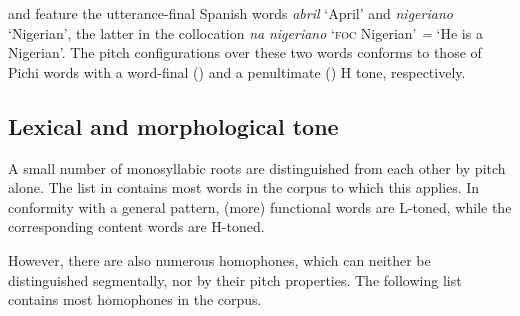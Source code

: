  
 and  feature the utterance-final Spanish words \textit{abril} ‘April’ and \textit{nigeriano} ‘Nigerian’, the latter in the collocation \textit{na} \textit{nigeriano} ‘\textsc{foc} Nigerian’ \textit{=} ‘He is a Nigerian’. The pitch configurations over these two words conforms to those of Pichi words with a word-final () and a penultimate () H tone, respectively. 


   \newpage 
 
\subsection{Lexical and morphological tone}

A small number of monosyllabic roots are distinguished from each other by pitch alone. The list in  contains most words in the corpus to which this applies. In conformity with a general pattern, (more) functional words are L-toned, while the corresponding content words are H-toned.


However, there are also numerous homophones, which can neither be distinguished segmentally, nor by their pitch properties. The following list contains most homophones in the corpus.


